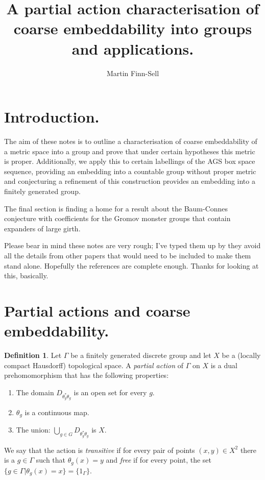 \documentclass[11pt,a4paper]{amsart}
\title{A partial action characterisation of coarse embeddability into groups and applications.}
\date{}
\author{Martin Finn-Sell}
\theoremstyle{plain}
\theoremstyle{definition}%
\newtheorem{definition}[theorem]{Definition}%
\theoremstyle{remark}%
\begin{document}
\maketitle

\section{Introduction.}

The aim of these notes is to outline a characterisation of coarse embeddability of a metric space into a group and prove that under certain hypotheses this metric is proper. Additionally, we apply this to certain labellings of the AGS box space sequence, providing an embedding into a countable group without proper metric and conjecturing a refinement of this construction provides an embedding into a finitely generated group.

The final section is finding a home for a result about the Baum-Connes conjecture with coefficients for the Gromov monster groups that contain expanders of large girth. 

Please bear in mind these notes are very rough; I've typed them up by they avoid all the details from other papers that would need to be included to make them stand alone. Hopefully the references are complete enough. Thanks for looking at this, basically. 

\section{Partial actions and coarse embeddability.}

\begin{definition}
Let $\Gamma$ be a finitely generated discrete group and let $X$ be a (locally compact Hausdorff) topological space. A \textit{partial action} of $\Gamma$ on $X$ is a dual prehomomorphism that has the following properties:
\begin{enumerate}
\item The domain $D_{\theta_{g}^{*}\theta_{g}}$ is an open set for every $g$.
\item $\theta_{g}$ is a continuous map.
\item The union: $\bigcup_{g \in G}D_{\theta_{g}^{*}\theta_{g}}$ is $X$.
\end{enumerate}
We say that the action is \textit{transitive} if for every pair of points $(x,y) \in X^{2}$ there is a $g\in \Gamma$ such that $\theta_{g}(x)=y$ and \textit{free} if for every point, the set $\lbrace g \in \Gamma | \theta_{g}(x)=x \rbrace=\lbrace 1_{\Gamma} \rbrace$.
\end{definition}
\end{document}
